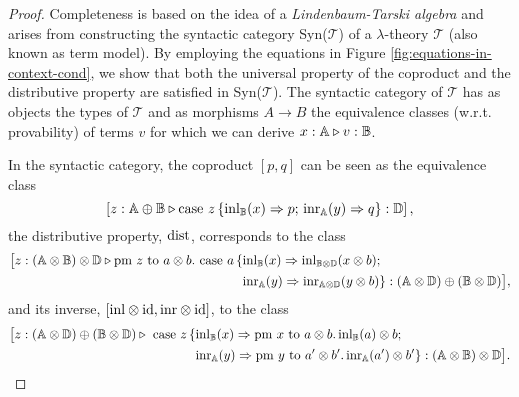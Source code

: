 \documentclass[10pt,a4paper]{amsart}
\theoremstyle{definition}
\theoremstyle{definition}
\theoremstyle{definition}
\theoremstyle{definition}
\theoremstyle{definition}
\theoremstyle{definition}
\begin{document}
\begin{proof}
  Completeness is based on the idea of a \textit{Lindenbaum-Tarski algebra} and arises from constructing the syntactic category Syn($\mathscr{T}$) of a $\lambda$-theory $\mathscr{T}$ (also known as term model). By employing the equations in Figure \ref{fig:equations-in-context-cond}, we show that both the universal property of the coproduct and the distributive property are satisfied in Syn($\mathscr{T}$). The syntactic category of $\mathscr{T}$ has as objects the types of $\mathscr{T}$ and as morphisms $A \rightarrow B$ the equivalence classes (w.r.t. provability) of terms $v$ for which we can derive $x : \mathbb{A} \triangleright v : \mathbb{B}$.

  In the syntactic category, the coproduct $[ p ,  q]$ can be seen as the equivalence
  class 
  $$\left[z:\mathbb{A} \oplus\mathbb{B} \triangleright \text{case } z\,\{\mathrm{inl}_{\mathbb{B}}(x) \Rightarrow p ; \, \mathrm{inr}_{\mathbb{A}}(y) \Rightarrow q\}: \mathbb{D}\right],$$ 
  the distributive property, $\mathrm{dist}$, corresponds to the class 
  \begin{align*}
    \big[z:(\mathbb{A} \otimes \mathbb{\mathbb{B}}) \otimes \mathbb{\mathbb{D}} \triangleright \text{pm } z \text{ to } a \otimes b. \text{ case } a\,\{ &\mathrm{inl}_{\mathbb{B}}(x) \Rightarrow \mathrm{inl}_{\mathbb{B} \otimes \mathbb{D}}(x \otimes b); \\
    & \mathrm{inr}_{\mathbb{A}}(y) \Rightarrow \mathrm{inr}_{\mathbb{A} \otimes \mathbb{D}} (y \otimes b)\}: (\mathbb{A} \otimes \mathbb{D}) \oplus (\mathbb{B} \otimes \mathbb{D})\big],
  \end{align*}
and its inverse, $[\mathrm{inl} \otimes \mathrm{id}, \mathrm{inr} \otimes \mathrm{id}]$, to the class
\begin{align*}
  \big[z: (\mathbb{A} \otimes \mathbb{D}) \oplus (\mathbb{B} \otimes \mathbb{D}) \triangleright  \text{ case } z \,\{ &\mathrm{inl}_{\mathbb{B}}(x) \Rightarrow \text{pm } x \text{ to } a \otimes b. \, \mathrm{inl}_{\mathbb{B}}(a) \otimes b; \\
  & \mathrm{inr}_{\mathbb{A}}(y) \Rightarrow \text{pm } y \text{ to } a' \otimes b'. \, \mathrm{inr}_{\mathbb{A}}(a') \otimes b'\}: (\mathbb{A} \otimes \mathbb{\mathbb{B}}) \otimes \mathbb{\mathbb{D}}\big].
\end{align*}



\end{proof}
\end{document}

